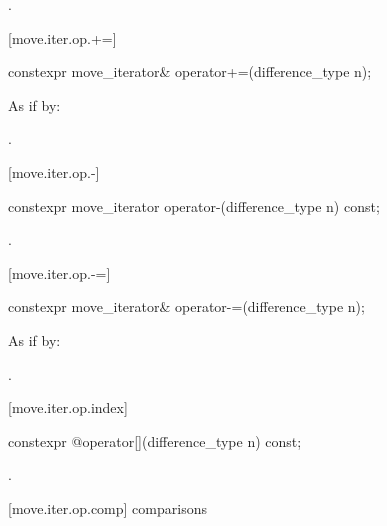 \begin{itemdescr}
\pnum
\returns {}.
\end{itemdescr}

[move.iter.op.+=]{}

%
\begin{itemdecl}
constexpr move_iterator& operator+=(difference_type n);
\end{itemdecl}

\begin{itemdescr}
\pnum
\effects As if by: 

\pnum
\returns {}.
\end{itemdescr}

[move.iter.op.-]{}

%
\begin{itemdecl}
constexpr move_iterator operator-(difference_type n) const;
\end{itemdecl}

\begin{itemdescr}
\pnum
\returns {}.
\end{itemdescr}

[move.iter.op.-=]{}

%
\begin{itemdecl}
constexpr move_iterator& operator-=(difference_type n);
\end{itemdecl}

\begin{itemdescr}
\pnum
\effects As if by: 

\pnum
\returns {}.
\end{itemdescr}

[move.iter.op.index]{}

%
\begin{itemdecl}
constexpr @\unspec@ operator[](difference_type n) const;
\end{itemdecl}

\begin{itemdescr}
\pnum
\returns {}.
\end{itemdescr}

[move.iter.op.comp]{ comparisons}

